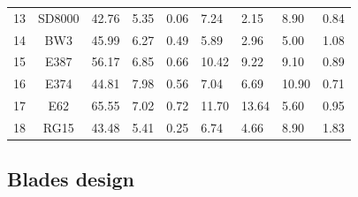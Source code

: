 \documentclass[../TFG_Report.tex]{subfiles}
\begin{document}
\begin{table}[]
\begin{tabular}{cc|C{1.5cm}|C{1.5cm}|C{1.75cm}|C{1.5cm}|C{1.5cm}|C{1.5cm}|C{1.3cm}}
		13         & SD8000  & 42.76 & 5.35    & 0.06                         & 7.24   & 2.15  & 8.90      & 0.84  \\
		14         & BW3     & 45.99 & 6.27    & 0.49                         & 5.89   & 2.96  & 5.00      & 1.08  \\
		15         & E387    & 56.17 & 6.85    & 0.66                         & 10.42  & 9.22  & 9.10      & 0.89  \\
		16         & E374    & 44.81 & 7.98    & 0.56                         & 7.04   & 6.69  & 10.90     & 0.71  \\
		17         & E62     & 65.55 & 7.02    & 0.72                         & 11.70  & 13.64 & 5.60      & 0.95  \\
		18         & RG15    & 43.48 & 5.41    & 0.25                         & 6.74   & 4.66  & 8.90      & 1.83 
	\end{tabular}

\end{table}


\subsection{Blades design}
	
	
\end{document}
